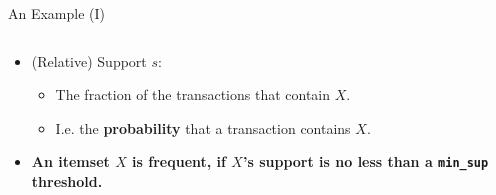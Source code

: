\begin{frame}{An Example (I)}
\begin{columns}
\begin{column}{0.5\textwidth}
\begin{itemize}
				\item (Relative) Support $s$:
				      \begin{itemize}
					      \item The fraction of the transactions that contain $X$.
					      \item I.e. the \textbf{probability} that a transaction
					            contains $X$.
				      \end{itemize}
				\item \textbf{An itemset $X$ is frequent, if $X$'s support is
					      no less than a \texttt{min\_sup} threshold.}
			\end{itemize}
		\end{column}
	\end{columns}
\end{frame}

